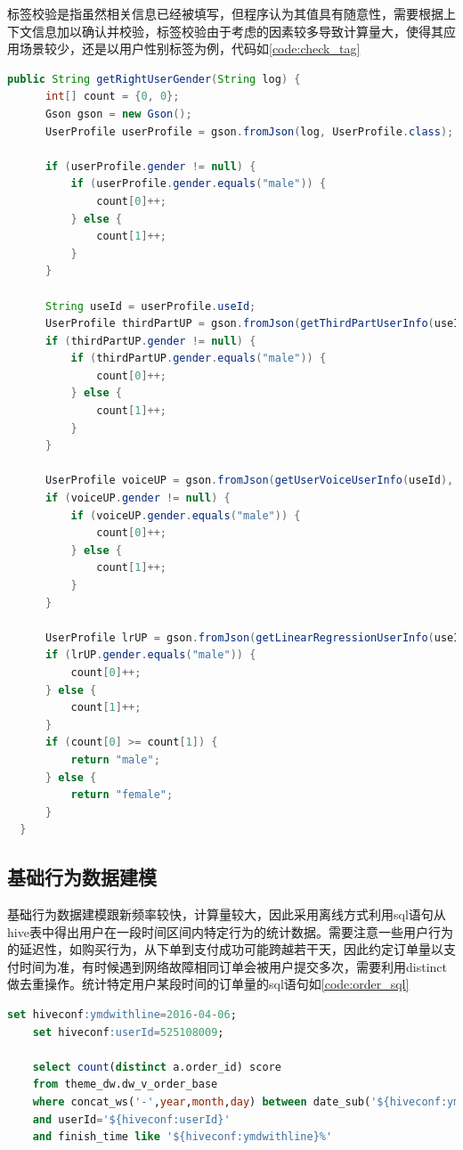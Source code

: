   标签校验是指虽然相关信息已经被填写，但程序认为其值具有随意性，需要根据上下文信息加以确认并校验，标签校验由于考虑的因素较多导致计算量大，使得其应用场景较少，还是以用户性别标签为例，代码如\autoref{code:check_tag}
  \begin{lstlisting}[language=java,firstnumber=1,label={code:check_tag}]
      public String getRightUserGender(String log) {
      int[] count = {0, 0};
      Gson gson = new Gson();
      UserProfile userProfile = gson.fromJson(log, UserProfile.class);

      if (userProfile.gender != null) {
          if (userProfile.gender.equals("male")) {
              count[0]++;
          } else {
              count[1]++;
          }
      }

      String useId = userProfile.useId;
      UserProfile thirdPartUP = gson.fromJson(getThirdPartUserInfo(useId), UserProfile.class);
      if (thirdPartUP.gender != null) {
          if (thirdPartUP.gender.equals("male")) {
              count[0]++;
          } else {
              count[1]++;
          }
      }

      UserProfile voiceUP = gson.fromJson(getUserVoiceUserInfo(useId), UserProfile.class);
      if (voiceUP.gender != null) {
          if (voiceUP.gender.equals("male")) {
              count[0]++;
          } else {
              count[1]++;
          }
      }

      UserProfile lrUP = gson.fromJson(getLinearRegressionUserInfo(useId), UserProfile.class);
      if (lrUP.gender.equals("male")) {
          count[0]++;
      } else {
          count[1]++;
      }
      if (count[0] >= count[1]) {
          return "male";
      } else {
          return "female";
      }
  }
  \end{lstlisting}

  \subsection{基础行为数据建模}
  基础行为数据建模跟新频率较快，计算量较大，因此采用离线方式利用sql语句从hive表中得出用户在一段时间区间内特定行为的统计数据。需要注意一些用户行为的延迟性，如购买行为，从下单到支付成功可能跨越若干天，因此约定订单量以支付时间为准，有时候遇到网络故障相同订单会被用户提交多次，需要利用distinct做去重操作。统计特定用户某段时间的订单量的sql语句如\autoref{code:order_sql}
  \begin{lstlisting}[language=SQL,firstnumber=1,label={code:order_sql}]
    set hiveconf:ymdwithline=2016-04-06;
    set hiveconf:userId=525108009;

    select count(distinct a.order_id) score
    from theme_dw.dw_v_order_base
    where concat_ws('-',year,month,day) between date_sub('${hiveconf:ymdwithline}',5) and '${hiveconf:ymdwithline}'
    and userId='${hiveconf:userId}'
    and finish_time like '${hiveconf:ymdwithline}%'
  \end{lstlisting}

